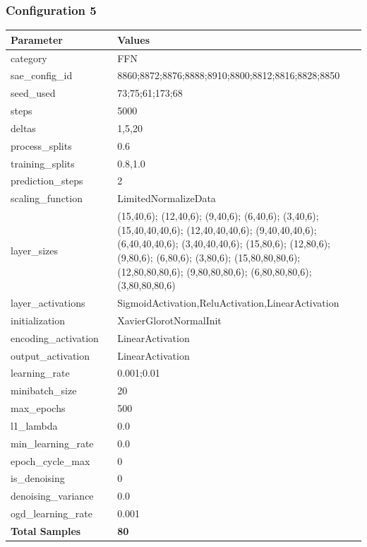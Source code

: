 \documentclass[a4paper,11pt,oneside]{article}
\theoremstyle{plain}
\theoremstyle{definition}
\begin{document}
	\newpage
	\subsubsection{Configuration 5}\label{config5}
	\begin{longtable}[H]{|p{0.3\linewidth}|p{0.7\linewidth}|} \hline \textbf{Parameter} &\textbf{Values} \\\hline{category} & {FFN} \\\hline
		{sae\_config\_id} & {8860;8872;8876;8888;8910;8800;8812;8816;8828;8850} \\\hline
		{seed\_used} & {73;75;61;173;68} \\\hline
		{steps} & {5000} \\\hline
		{deltas} & {1,5,20} \\\hline
		{process\_splits} & {0.6} \\\hline
		{training\_splits} & {0.8,1.0} \\\hline
		{prediction\_steps} & {2} \\\hline
		{scaling\_function} & {LimitedNormalizeData} \\\hline
		{layer\_sizes} & {(15,40,6); (12,40,6); (9,40,6); (6,40,6); (3,40,6); (15,40,40,40,6); (12,40,40,40,6); (9,40,40,40,6); (6,40,40,40,6); (3,40,40,40,6); (15,80,6); (12,80,6); (9,80,6); (6,80,6); (3,80,6); (15,80,80,80,6); (12,80,80,80,6); (9,80,80,80,6); (6,80,80,80,6); (3,80,80,80,6)} \\\hline
		{layer\_activations} & {SigmoidActivation,ReluActivation,LinearActivation} \\\hline
		{initialization} & {XavierGlorotNormalInit} \\\hline
		{encoding\_activation} & {LinearActivation} \\\hline
		{output\_activation} & {LinearActivation} \\\hline
		{learning\_rate} & {0.001;0.01} \\\hline
		{minibatch\_size} & {20} \\\hline
		{max\_epochs} & {500} \\\hline
		{l1\_lambda} & {0.0} \\\hline
		{min\_learning\_rate} & {0.0} \\\hline
		{epoch\_cycle\_max} & {0} \\\hline
		{is\_denoising} & {0} \\\hline
		{denoising\_variance} & {0.0} \\\hline
		{ogd\_learning\_rate} & {0.001} \\\hline
		{\textbf{Total Samples}} & {\textbf{80}} \\\hline
	\end{longtable}
\end{document}
